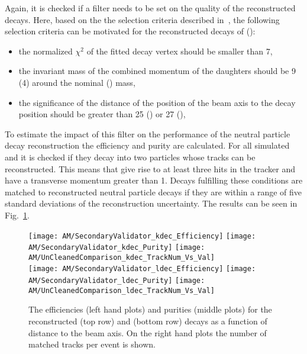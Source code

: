 Again, it is checked if a filter needs to be set on the quality of the reconstructed decays. Here, based on the the selection criteria described in~\cite{v0paper}, the following selection criteria can be motivated for the reconstructed decays of \PKzS{} (\PgL{}):
\begin{itemize}
    \item the normalized $\chi^{2}$ of the fitted decay vertex should be smaller than 7,
    \item the invariant mass of the combined momentum of the daughters should be 9\MeVcc{} (4\MeVcc{}) around the nominal \PKzS{} (\PgL{}) mass,
    \item the significance of the distance of the position of the beam axis to the decay position should be greater than 25 (\PKzS{}) or 27 (\PgL{}),
\end{itemize}
To estimate the impact of this filter on the performance of the neutral particle decay reconstruction the efficiency and purity are calculated. For all simulated \PKzS{} and \PgL{} it is checked if they decay into two particles whose tracks can be reconstructed. This means that give rise to at least three hits in the tracker and have a transverse momentum greater than 1\GeV. Decays fulfilling these conditions are matched to reconstructed neutral particle decays if they are within a range of five standard deviations of the reconstruction uncertainty. The results can be seen in Fig.~\ref{plot:AMWFSVdecEffAndPurDC}.

\begin{figure}[Ht]
    \centering
    \texttt{[image: AM/SecondaryValidator\_kdec\_Efficiency]}
    \texttt{[image: AM/SecondaryValidator\_kdec\_Purity]}
    \texttt{[image: AM/UnCleanedComparison\_kdec\_TrackNum\_Vs\_Val]}
    \\
    \texttt{[image: AM/SecondaryValidator\_ldec\_Efficiency]}
    \texttt{[image: AM/SecondaryValidator\_ldec\_Purity]}
    \texttt{[image: AM/UnCleanedComparison\_ldec\_TrackNum\_Vs\_Val]}
    \caption[Efficiency and purity of the reconstructed \PKzS{} and \PgL{} decays as a function of distance to the beam axis and number of matched tracks]{The efficiencies (left hand plots) and purities (middle plots) for the reconstructed \PKzS{} (top row) and \PgL{} (bottom row) decays as a function of distance to the beam axis. On the right hand plots the number of matched tracks per event is shown. \label{plot:AMWFSVdecEffAndPurDC}}
\end{figure}

